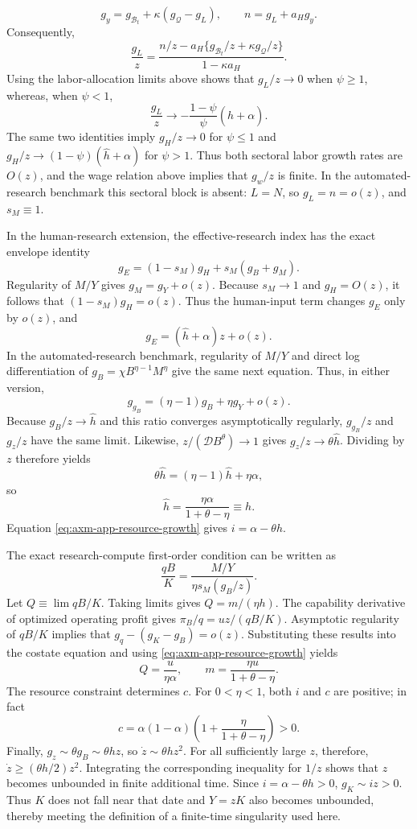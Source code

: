 \[
 g_y=g_{\mathcal B_t}+\kappa(g_{\mathcal Q}-g_L),\qquad
 n=g_L+a_Hg_y.
\]
Consequently,
\[
 \frac{g_L}{z}
 =
 \frac{n/z-a_H\{g_{\mathcal B_t}/z+\kappa g_{\mathcal Q}/z\}}
 {1-\kappa a_H}.
\]
Using the labor-allocation limits above shows that \(g_L/z\to0\) when
\(\psi\geq1\), whereas, when \(\psi<1\),
\begin{equation}
 \frac{g_L}{z}\to
 -\frac{1-\psi}{\psi}(\widehat h+\alpha).
 \label{eq:axm-app-production-labor-growth}
\end{equation}
The same two identities imply \(g_H/z\to0\) for \(\psi\leq1\) and
\(g_H/z\to(1-\psi)(\widehat h+\alpha)\) for \(\psi>1\).
Thus both sectoral labor growth rates are \(O(z)\), and the wage relation above
implies that \(g_w/z\) is finite. In the automated-research benchmark this
sectoral block is absent: \(L=N\), so \(g_L=n=o(z)\), and \(s_M\equiv1\).

In the human-research extension, the effective-research index has the exact
envelope identity
\[
 g_E=(1-s_M)g_H+s_M(g_B+g_M).
\]
Regularity of \(M/Y\) gives \(g_M=g_Y+o(z)\). Because \(s_M\to1\) and
\(g_H=O(z)\), it follows that
\((1-s_M)g_H=o(z)\). Thus the human-input term changes \(g_E\) only by
\(o(z)\), and
\[
 g_E=(\widehat h+\alpha)z+o(z).
\]
In the automated-research benchmark, regularity of \(M/Y\) and direct log
differentiation of \(g_B=\chi B^{\eta-1}M^\eta\) give the same next equation.
Thus, in either version,
\[
 g_{g_B}=(\eta-1)g_B+\eta g_Y+o(z).
\]
Because \(g_B/z\to\widehat h\) and this ratio converges asymptotically regularly,
\(g_{g_B}/z\) and \(g_z/z\) have the same limit. Likewise,
\(z/(\mathcal D B^\theta)\to1\) gives
\(g_z/z\to\theta\widehat h\). Dividing by \(z\)
therefore yields
\[
 \theta\widehat h=(\eta-1)\widehat h+\eta\alpha,
\]
so
\[
 \widehat h=\frac{\eta\alpha}{1+\theta-\eta}\equiv h.
\]
Equation \eqref{eq:axm-app-resource-growth} gives \(i=\alpha-\theta h\).

The exact research-compute first-order condition can be written as
\[
 \frac{qB}{K}=\frac{M/Y}{\eta s_M(g_B/z)}.
\]
Let \(Q\equiv\lim qB/K\). Taking limits gives \(Q=m/(\eta h)\). The capability
derivative of optimized operating profit gives \(\pi_B/q=uz/(qB/K)\).
Asymptotic regularity of \(qB/K\) implies that
\(g_q-(g_K-g_B)=o(z)\). Substituting these results into the costate equation and using
\eqref{eq:axm-app-resource-growth} yields
\[
 Q=\frac{u}{\eta\alpha},
 \qquad
 m=\frac{\eta u}{1+\theta-\eta}.
\]
The resource constraint determines \(c\). For \(0<\eta<1\), both \(i\) and \(c\)
are positive; in fact
\[
 c=\alpha(1-\alpha)
 \left(1+\frac{\eta}{1+\theta-\eta}\right)>0.
\]
Finally, \(g_z\sim\theta g_B\sim\theta hz\), so
\(\dot z\sim\theta hz^2\). For all sufficiently large \(z\), therefore,
\(\dot z\geq(\theta h/2)z^2\). Integrating the corresponding inequality for
\(1/z\) shows that \(z\) becomes unbounded in finite additional time. Since
\(i=\alpha-\theta h>0\), \(g_K\sim iz>0\). Thus \(K\) does not fall near that
date and \(Y=zK\) also becomes unbounded, thereby meeting the definition of a
finite-time singularity used here.

